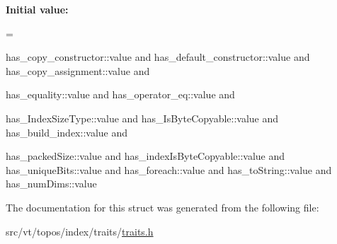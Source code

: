 {\bfseries Initial value\+:}
\begin{DoxyCode}
=
    
    has\_copy\_constructor::value    and
    has\_default\_constructor::value and
    has\_copy\_assignment::value     and
    
    has\_equality::value            and
    has\_operator\_eq::value         and
    
    has\_IndexSizeType::value       and
    has\_IsByteCopyable::value      and
    has\_build\_index::value         and
    
    has\_packedSize::value          and
    has\_indexIsByteCopyable::value and
    has\_uniqueBits::value          and
    has\_foreach::value             and
    has\_toString::value            and
    has\_numDims::value
\end{DoxyCode}


The documentation for this struct was generated from the following file\+:\begin{DoxyCompactItemize}
\item 
src/vt/topos/index/traits/\hyperlink{traits_8h}{traits.\+h}\end{DoxyCompactItemize}
